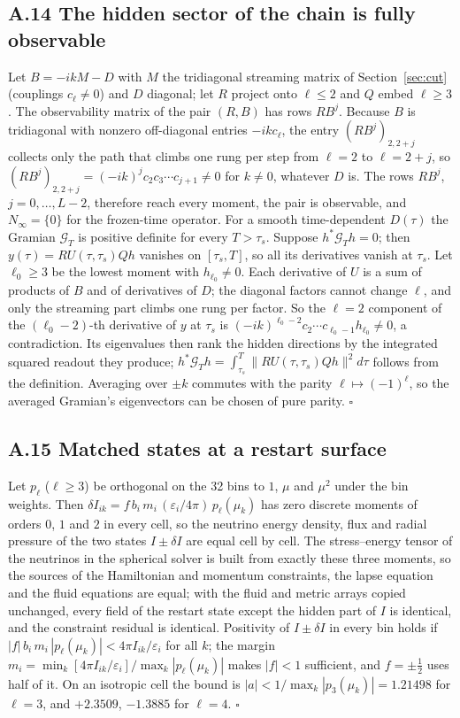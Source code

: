 \subsection*{A.14 The hidden sector of the chain is fully observable}
Let $B=-ikM-D$ with $M$ the tridiagonal streaming matrix of Section~\ref{sec:cut} (couplings $c_\ell\neq0$) and $D$ diagonal; let $R$ project onto $\ell\le2$ and $Q$ embed $\ell\ge3$. The observability matrix of the pair $(R,B)$ has rows $RB^j$. Because $B$ is tridiagonal with nonzero off-diagonal entries $-ikc_\ell$, the entry $(RB^j)_{2,2+j}$ collects only the path that climbs one rung per step from $\ell=2$ to $\ell=2+j$, so $(RB^j)_{2,2+j}=(-ik)^jc_2c_3\cdots c_{j+1}\neq0$ for $k\neq0$, whatever $D$ is. The rows $RB^j$, $j=0,\dots,L-2$, therefore reach every moment, the pair is observable, and $N_\infty=\{0\}$ for the frozen-time operator. For a smooth time-dependent $D(\tau)$ the Gramian $\mathcal G_T$ is positive definite for every $T>\tau_s$. Suppose $h^\ast\mathcal G_Th=0$; then $y(\tau)=RU(\tau,\tau_s)Qh$ vanishes on $[\tau_s,T]$, so all its derivatives vanish at $\tau_s$. Let $\ell_0\ge3$ be the lowest moment with $h_{\ell_0}\ne0$. Each derivative of $U$ is a sum of products of $B$ and of derivatives of $D$; the diagonal factors cannot change $\ell$, and only the streaming part climbs one rung per factor. So the $\ell=2$ component of the $(\ell_0-2)$-th derivative of $y$ at $\tau_s$ is $(-ik)^{\ell_0-2}c_2\cdots c_{\ell_0-1}h_{\ell_0}\ne0$, a contradiction. Its eigenvalues then rank the hidden directions by the integrated squared readout they produce; $h^\ast\mathcal G_Th=\int_{\tau_s}^T\lVert RU(\tau,\tau_s)Qh\rVert^2d\tau$ follows from the definition. Averaging over $\pm k$ commutes with the parity $\ell\mapsto(-1)^\ell$, so the averaged Gramian's eigenvectors can be chosen of pure parity. $\square$

\subsection*{A.15 Matched states at a restart surface}
Let $p_\ell$ ($\ell\ge3$) be orthogonal on the 32 bins to $1$, $\mu$ and $\mu^2$ under the bin weights. Then $\delta I_{ik}=f\,b_i\,m_i\,(\varepsilon_i/4\pi)\,p_\ell(\mu_k)$ has zero discrete moments of orders $0$, $1$ and $2$ in every cell, so the neutrino energy density, flux and radial pressure of the two states $I\pm\delta I$ are equal cell by cell. The stress--energy tensor of the neutrinos in the spherical solver is built from exactly these three moments, so the sources of the Hamiltonian and momentum constraints, the lapse equation and the fluid equations are equal; with the fluid and metric arrays copied unchanged, every field of the restart state except the hidden part of $I$ is identical, and the constraint residual is identical. Positivity of $I\pm\delta I$ in every bin holds if $|f|\,b_i\,m_i\,|p_\ell(\mu_k)|<4\pi I_{ik}/\varepsilon_i$ for all $k$; the margin $m_i=\min_k[4\pi I_{ik}/\varepsilon_i]/\max_k|p_\ell(\mu_k)|$ makes $|f|<1$ sufficient, and $f=\pm\tfrac12$ uses half of it. On an isotropic cell the bound is $|a|<1/\max_k|p_3(\mu_k)|=1.21498$ for $\ell=3$, and $+2.3509$, $-1.3885$ for $\ell=4$. $\square$
